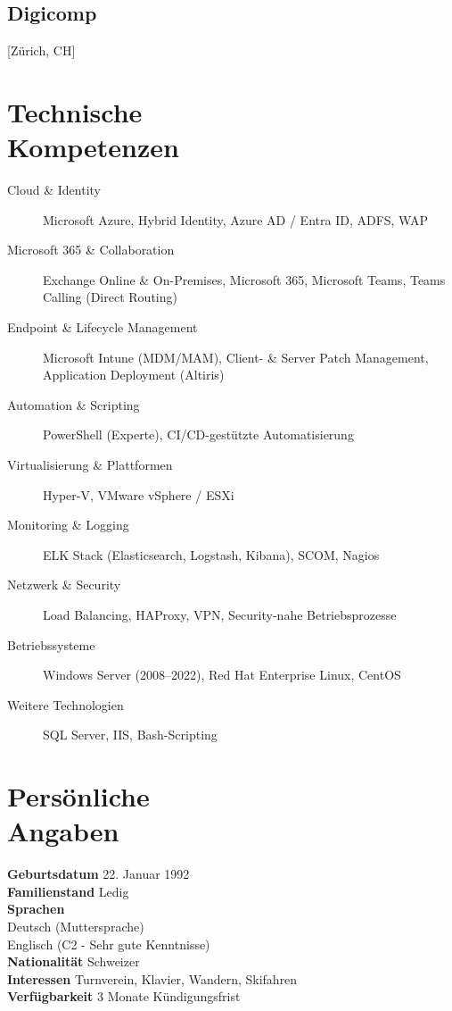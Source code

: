\documentclass{cv}
\begin{document}
\subsection{Digicomp}[Zürich, CH]
\begin{positions}
\end{positions}

\section{Technische\\Kompetenzen}
\begin{description}
\item[Cloud \& Identity] Microsoft Azure, Hybrid Identity, Azure AD / Entra ID, ADFS, WAP
\item[Microsoft 365 \& Collaboration] Exchange Online \& On-Premises, Microsoft 365, Microsoft Teams, Teams Calling (Direct Routing)
\item[Endpoint \& Lifecycle Management] Microsoft Intune (MDM/MAM), Client- \& Server Patch Management, Application Deployment (Altiris)
\item[Automation \& Scripting] PowerShell (Experte), CI/CD-gestützte Automatisierung
\item[Virtualisierung \& Plattformen] Hyper-V, VMware vSphere / ESXi
\item[Monitoring \& Logging] ELK Stack (Elasticsearch, Logstash, Kibana), SCOM, Nagios
\item[Netzwerk \& Security] Load Balancing, HAProxy, VPN, Security-nahe Betriebsprozesse
\item[Betriebssysteme] Windows Server (2008–2022), Red Hat Enterprise Linux, CentOS
\item[Weitere Technologien] SQL Server, IIS, Bash-Scripting
\end{description}


\section{Persönliche \\Angaben}
\textbf{Geburtsdatum} 22. Januar 1992\\
\textbf{Familienstand} Ledig\\
\textbf{Sprachen\\} 
\hspace*{0.4cm}Deutsch (Muttersprache)\\
\hspace*{0.4cm}Englisch (C2 - Sehr gute Kenntnisse)\\
\textbf{Nationalität} Schweizer \\
\textbf{Interessen} Turnverein, Klavier, Wandern, Skifahren \\
\textbf{Verfügbarkeit} 3 Monate Kündigungsfrist
\end{document}
